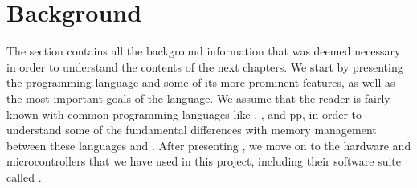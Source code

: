 
\chapter{Background}
\label{chap:background}

The section contains all the background information that was deemed necessary in order to understand the contents of the next chapters.
We start by presenting the {\rust} programming language and some of its more prominent features, as well as the most important goals of the language.
We assume that the reader is fairly known with common programming languages like {\Java}, {\C}, and {\C}pp, in order to understand some of the fundamental differences with memory management between these languages and {\rust}.
After presenting {\rust}, we move on to the hardware and microcontrollers that we have used in this project, including their software suite called \emlib.








% 
% 
% 
